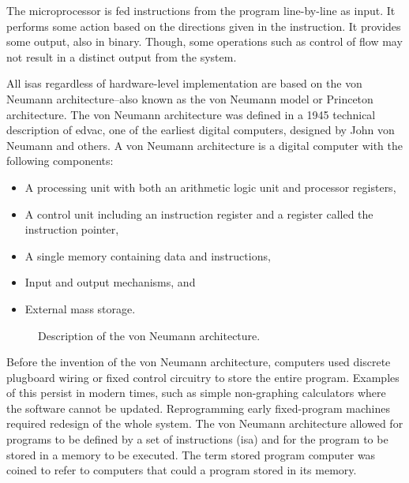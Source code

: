\documentclass[letterpaper, 12pt]{book}
\begin{document}
The microprocessor is fed %
instructions from the program line-by-line as input. It performs some action based on the directions given in 
the instruction. It provides some output, also in binary. Though, some operations such as \gls{control of flow} 
may not result in a distinct output from the system. %


All \glspl{isa} regardless of hardware-level implementation are based on the \gls{von Neumann architecture}--also known 
as the von Neumann model or Princeton architecture. The \gls{von Neumann architecture} was defined in a 1945 technical %
description of \gls{edvac}, one of the 
earliest digital computers, designed by John von Neumann and others. A \gls{von Neumann architecture} is a digital computer 
with the following components: 
%
\begin{itemize}
    \item A processing unit with both an \gls{arithmetic logic unit} and processor \glspl{register},
    \item A \gls{control unit} including an \gls{instruction register} and a register called the \gls{instruction pointer},
    \item A single memory containing data and instructions,
    \item Input and output mechanisms, and
    \item External mass storage.
\end{itemize}
%

\begin{figure}\centering
    \caption{Description of the von Neumann architecture.\label{fig:vonNeumann}}
\end{figure}

Before the invention of the \gls{von Neumann architecture}, computers used discrete plugboard wiring or fixed
control circuitry to store the entire program. Examples of this persist in modern times, such as simple non-graphing calculators 
where the software cannot be updated. Reprogramming early fixed-program machines required redesign of the whole 
system. The \gls{von Neumann architecture} allowed for programs to be defined by a set of instructions (\gls{isa})
and for the program to be stored in a memory to be executed. The term \gls{stored program computer} was coined to refer 
to computers that could a program stored in its memory. 
\end{document}
